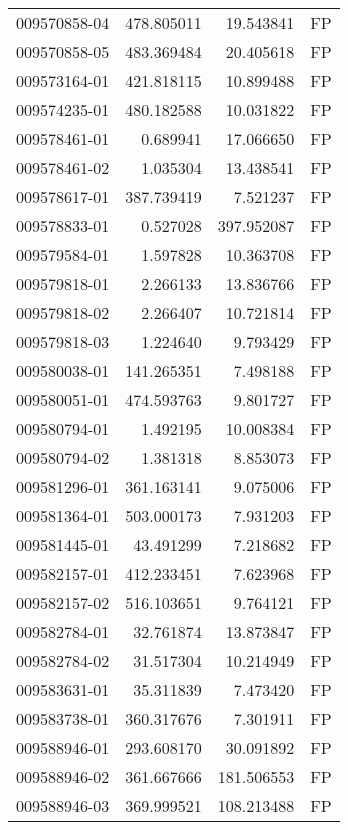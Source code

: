 \begin{tabular}{lrrl}
009570858-04 &  478.805011 &      19.543841 &   FP \\
009570858-05 &  483.369484 &      20.405618 &   FP \\
009573164-01 &  421.818115 &      10.899488 &   FP \\
009574235-01 &  480.182588 &      10.031822 &   FP \\
009578461-01 &    0.689941 &      17.066650 &   FP \\
009578461-02 &    1.035304 &      13.438541 &   FP \\
009578617-01 &  387.739419 &       7.521237 &   FP \\
009578833-01 &    0.527028 &     397.952087 &   FP \\
009579584-01 &    1.597828 &      10.363708 &   FP \\
009579818-01 &    2.266133 &      13.836766 &   FP \\
009579818-02 &    2.266407 &      10.721814 &   FP \\
009579818-03 &    1.224640 &       9.793429 &   FP \\
009580038-01 &  141.265351 &       7.498188 &   FP \\
009580051-01 &  474.593763 &       9.801727 &   FP \\
009580794-01 &    1.492195 &      10.008384 &   FP \\
009580794-02 &    1.381318 &       8.853073 &   FP \\
009581296-01 &  361.163141 &       9.075006 &   FP \\
009581364-01 &  503.000173 &       7.931203 &   FP \\
009581445-01 &   43.491299 &       7.218682 &   FP \\
009582157-01 &  412.233451 &       7.623968 &   FP \\
009582157-02 &  516.103651 &       9.764121 &   FP \\
009582784-01 &   32.761874 &      13.873847 &   FP \\
009582784-02 &   31.517304 &      10.214949 &   FP \\
009583631-01 &   35.311839 &       7.473420 &   FP \\
009583738-01 &  360.317676 &       7.301911 &   FP \\
009588946-01 &  293.608170 &      30.091892 &   FP \\
009588946-02 &  361.667666 &     181.506553 &   FP \\
009588946-03 &  369.999521 &     108.213488 &   FP \\

\end{tabular}
